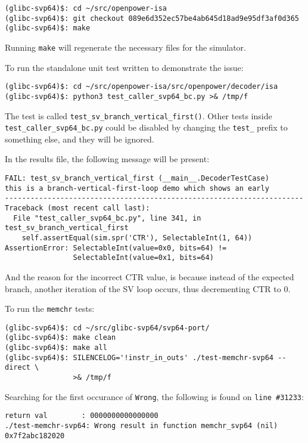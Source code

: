 \begin{verbatim}
(glibc-svp64)$: cd ~/src/openpower-isa
(glibc-svp64)$: git checkout 089e6d352ec57be4ab645d18ad9e95df3af0d365
(glibc-svp64)$: make
\end{verbatim}

Running \texttt{make} will regenerate the necessary files for the simulator.

To run the standalone unit test written to demonstrate the issue:
\begin{verbatim}
(glibc-svp64)$: cd ~/src/openpower-isa/src/openpower/decoder/isa
(glibc-svp64)$: python3 test_caller_svp64_bc.py >& /tmp/f
\end{verbatim}

The test is called \texttt{test\_sv\_branch\_vertical\_first()}. Other tests inside
\texttt{test\_caller\_svp64\_bc.py} could be disabled by changing the
\texttt{test\_} prefix to something else, and they will be ignored.

In the results file, the following message will be present:
\begin{verbatim}
FAIL: test_sv_branch_vertical_first (__main__.DecoderTestCase)
this is a branch-vertical-first-loop demo which shows an early
----------------------------------------------------------------------
Traceback (most recent call last):
  File "test_caller_svp64_bc.py", line 341, in test_sv_branch_vertical_first
    self.assertEqual(sim.spr('CTR'), SelectableInt(1, 64))
AssertionError: SelectableInt(value=0x0, bits=64) !=
                SelectableInt(value=0x1, bits=64)
\end{verbatim}

And the reason for the incorrect \acrshort{CTR} value, is because instead of the expected
branch, another iteration of the \acrfull{SV} loop occurs, thus
decrementing \acrshort{CTR} to 0.

To run the \texttt{memchr} tests:
\begin{verbatim}
(glibc-svp64)$: cd ~/src/glibc-svp64/svp64-port/
(glibc-svp64)$: make clean
(glibc-svp64)$: make all
(glibc-svp64)$: SILENCELOG='!instr_in_outs' ./test-memchr-svp64 --direct \
                >& /tmp/f
\end{verbatim}


Searching for the first occurance of \texttt{Wrong}, the following is found on
\texttt{line \#31233}:
\begin{verbatim}
return val        : 0000000000000000
./test-memchr-svp64: Wrong result in function memchr_svp64 (nil) 0x7f2abc182020
\end{verbatim}

